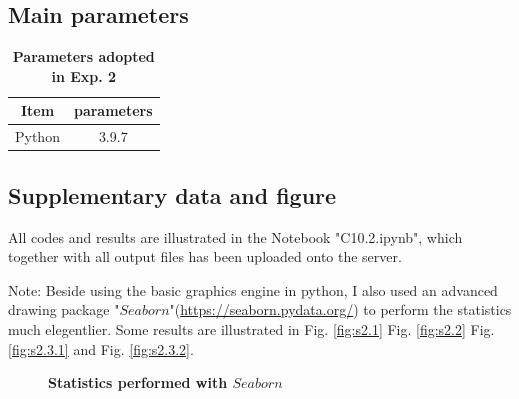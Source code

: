 \documentclass[12pt,a4paper,UTF8]{article}
\begin{document}
    \subsection{Main parameters}
    \begin{table}[htbp]
        \centering
            \begin{tabular}{cc}
                \toprule
                Item &parameters  \\
                \midrule
                Python &3.9.7 \\
                \bottomrule
            \end{tabular}
            \caption{\textbf{Parameters adopted in Exp. 2}}
            \label{tab:2.1}
    \end{table}	

    \subsection{Supplementary data and figure}
    All codes and results are illustrated in the Notebook "C10.2.ipynb", which together with all output files has been uploaded onto the server.
    
    Note: Beside using the basic graphics engine in python, I also used an advanced drawing package "$Seaborn$"(\url{https://seaborn.pydata.org/}) 
    to perform the statistics much elegentlier. Some results are illustrated in Fig. \ref{fig:s2.1} Fig. \ref{fig:s2.2} Fig. \ref{fig:s2.3.1} and Fig. \ref{fig:s2.3.2}.

    \begin{figure}[htbp]
        \centering

        \caption{\textbf{Statistics performed with $Seaborn$}}
    \end{figure}
\end{document}
